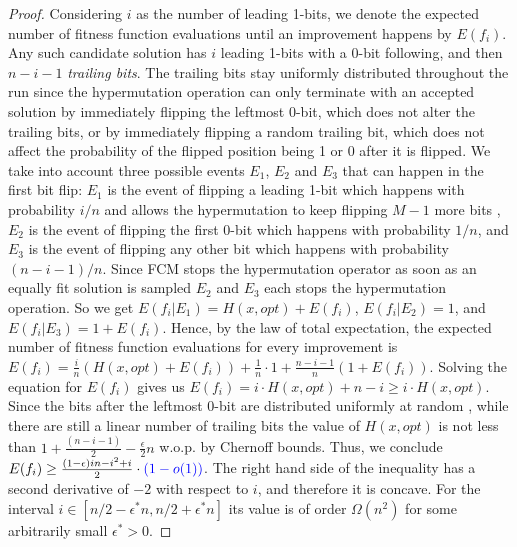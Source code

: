 \documentclass[lettersize,journal]{IEEEtran}
\begin{document}
\begin{proof}
Considering $i$ as the number of leading 1-bits, we denote the expected number of fitness function evaluations until an improvement happens by $E(f_i)$. Any such candidate solution has $i$ leading 1-bits with a 0-bit following, and then $n-i-1$ \emph{trailing bits}. The trailing bits stay uniformly distributed throughout the run since the hypermutation operation can only terminate with an accepted solution by immediately flipping the leftmost $0$-bit, which does not alter the trailing bits, or by immediately flipping a random trailing bit, which does not affect the probability of the flipped position being 1 or 0 after it is flipped\cite{DrosteJansenWegener2002}.   We take into account three possible events $E_1$, $E_2$ and $E_3$ that can happen in the first bit flip: $E_1$ is the event of flipping a leading 1-bit which happens with probability $i/n$ {\color{blue} and allows the hypermutation to keep flipping $M-1$ more bits }, $E_2$ is the event of flipping the first 0-bit which happens with probability $1/n$, and $E_3$ is the event of flipping any other bit which happens with probability $(n-i-1)/n$. {\color{blue}Since FCM stops the hypermutation operator as soon as an equally fit solution is sampled $E_2$ and $E_3$ each stops the hypermutation operation.} So we get $E(f_i|E_1)=H(x,opt)+ E(f_i)$, $E(f_i|E_2)=1$, and $E(f_i|E_3)=1+ E(f_i)$. Hence, by the law of total expectation, the expected number of fitness function evaluations for every improvement is $ E(f_i) = \frac{i}{n} \left( H(x,opt)+ E(f_i)\right) + \frac{1}{n} \cdot 1 +\frac{n-i-1}{n} \left( 1+ E(f_i)\right)$. Solving the equation for $E(f_i)$ gives us $E(f_i)=
i\cdot H(x,opt)+n-i\geq i\cdot H(x,opt) $. Since the bits after the leftmost 0-bit are distributed uniformly at random \cite{DrosteJansenWegener2002}, {\color{blue} while there are still a linear number of trailing bits} the value of $H(x,opt)$ is not less than $1+ \frac{(n-i-1)}{2}- \frac{\epsilon }{2}n$ w.o.p. by Chernoff bounds. Thus, we conclude $E(f_i) \geq \frac{(1-\epsilon)in-i^2+i}{2}\cdot {\color{blue}(1-o(1))}$. The right hand side of the inequality has a second derivative of $-2$ with respect to $i$, and therefore it is concave. For the interval $i\in [n/2-\epsilon^*n, n/2+\epsilon^*n]$ its value is of order $\Omega(n^2)$ for some   arbitrarily small $\epsilon^*>0$.



\end{proof}
\end{document}
